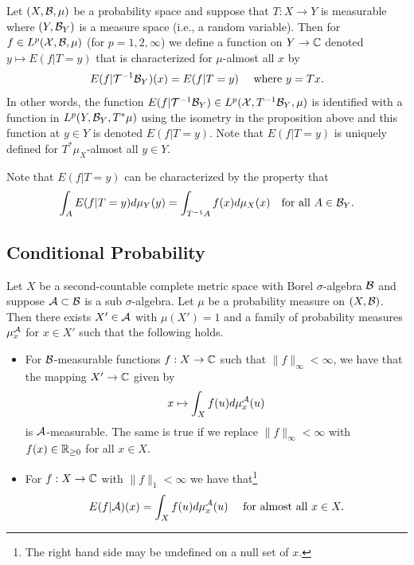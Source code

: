 \documentclass[twoside, a4paper, 10pt]{amsart}
\begin{document}
\begin{mydef} Let $(X, \mathcal{B}, \mu)$ be a probability space and suppose that $T:X \to Y$ is measurable where $(Y, \mathcal{B}_Y)$ is a measure space (i.e., a random variable). Then for $f \in L^p(\mathcal{X},\mathcal{B},\mu)$ (for $p=1,2,\infty$) we define a function on $Y \to \mathbb{C}$ denoted $y \mapsto E(f| T=y)$ that is characterized for $\mu$-almost all $x$ by  $$E(f|\mathcal{T}^{-1}\mathcal{B}_Y)(x) = E(f| T=y) \quad\text{ where }y = Tx.$$ In other words, the function $E(f|\mathcal{T}^{-1}\mathcal{B}_Y) \in L^p(\mathcal{X},T^{-1}\mathcal{B}_Y,\mu)$ is identified with a function in $L^p(Y, \mathcal{B}_Y,  T^*\mu)$ using the isometry in the proposition above and this function at $y \in Y$ is denoted $E(f| T=y)$. Note that $E(f|T=y)$ is uniquely defined for $T^*\mu_X$-almost all $y \in Y$.

\end{mydef}

Note that $E(f|T=y)$ can be characterized by the property that $$\int_A E(f|T=y) d\mu_Y(y) = \int_{T^{-1}A} f(x) d\mu_X(x) \quad \text{for all } A \in \mathcal{B}_Y.$$ 

\subsection{Conditional Probability}

\begin{thm} \label{thm: cond prop existence} Let $X$ be a second-countable complete metric space with Borel $\sigma$-algebra $\mathcal{B}$ and suppose $\mathcal{A} \subset \mathcal{B}$ is a sub $\sigma$-algebra. Let $\mu$ be a probability measure on $(X,\mathcal{B})$. Then there exists $X' \in \mathcal{A}$ with $\mu(X')=1$ and a family of probability measures $\mu_x^{\mathcal{A}}$ for $x \in X'$ such that the following holds.

\begin{itemize}
	\item For $\mathcal{B}$-measurable functions $f:X \to \mathbb{C}$ such that $\|f\|_{\infty} < \infty$, we have that the mapping $X' \to \mathbb{C}$ given by $$x \mapsto \int_X f(u) d\mu_x^{\mathcal{A}} (u)$$ is $\mathcal{A}$-measurable. The same is true if we replace $\|f\|_{\infty} < \infty$ with $f(x) \in \mathbb{R}_{\geq 0}$ for all $x \in X$.
	\item For $f: X \to \mathbb{C}$ with $\|f\|_1 < \infty$ we have that\footnote{The right hand side may be undefined on a null set of $x$.}  $$E(f|\mathcal{A})(x) = \int_X f(u) d\mu_x^{\mathcal{A}} (u) \quad \text{ for almost all } x \in X.$$

\end{itemize}

\end{thm}
\end{document}
